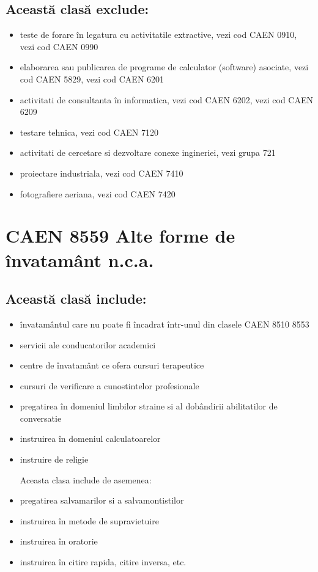 \documentclass{article}
\begin{document}
\subsection*{Această clasă exclude:}
\begin{itemize}
\item teste de forare în legatura cu activitatile extractive, vezi cod CAEN 0910, vezi cod CAEN 0990
\item elaborarea sau publicarea de programe de calculator (software) asociate, vezi cod CAEN 5829, vezi cod CAEN 6201
\item activitati de consultanta în informatica, vezi cod CAEN 6202, vezi cod CAEN 6209
\item testare tehnica, vezi cod CAEN 7120
\item activitati de cercetare si dezvoltare conexe ingineriei, vezi grupa 721
\item proiectare industriala, vezi cod CAEN 7410
\item fotografiere aeriana, vezi cod CAEN 7420
\end{itemize}



\section*{CAEN 8559 Alte forme de învatamânt n.c.a.}
\subsection*{Această clasă include:}
\begin{itemize}
\item învatamântul care nu poate fi încadrat într-unul din clasele CAEN 8510 8553
\item servicii ale conducatorilor academici
\item centre de învatamânt ce ofera cursuri terapeutice
\item cursuri de verificare a cunostintelor profesionale
\item pregatirea în domeniul limbilor straine si al dobândirii abilitatilor de conversatie
\item instruirea în domeniul calculatoarelor
\item instruire de religie

Aceasta clasa include de asemenea:
\item pregatirea salvamarilor si a salvamontistilor
\item instruirea în metode de supravietuire
\item instruirea în oratorie
\item instruirea în citire rapida, citire inversa, etc.
\end{itemize}
\end{document}
